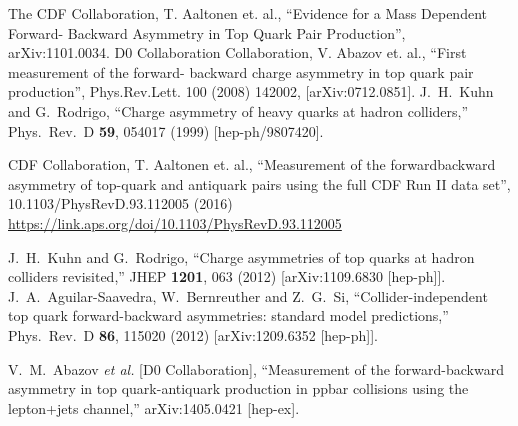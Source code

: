 \documentclass{cmspaperpdf}
\begin{document}
\clearpage


\begin{thebibliography}{9}

  The CDF Collaboration, T. Aaltonen et. al., ``Evidence for a Mass Dependent Forward- Backward Asymmetry in Top Quark Pair Production'', arXiv:1101.0034.
   D0 Collaboration Collaboration, V. Abazov et. al., ``First measurement of the forward- backward charge asymmetry in top quark pair production'', Phys.Rev.Lett. 100 (2008) 142002, [arXiv:0712.0851].
  J.~H.~Kuhn and G.~Rodrigo,
  ``Charge asymmetry of heavy quarks at hadron colliders,''
  Phys.\ Rev.\ D {\bf 59}, 054017 (1999)
  [hep-ph/9807420].
  
 CDF Collaboration, T. Aaltonen et. al., ``Measurement of the forwardbackward asymmetry of top-quark and antiquark pairs using the full CDF Run II data set'', 10.1103/PhysRevD.93.112005 (2016) \url{https://link.aps.org/doi/10.1103/PhysRevD.93.112005}
 
  
  J.~H.~Kuhn and G.~Rodrigo,
  ``Charge asymmetries of top quarks at hadron colliders revisited,''
  JHEP {\bf 1201}, 063 (2012)
  [arXiv:1109.6830 [hep-ph]].
  J.~A.~Aguilar-Saavedra, W.~Bernreuther and Z.~G.~Si,
  ``Collider-independent top quark forward-backward asymmetries: standard model predictions,''
  Phys.\ Rev.\ D {\bf 86}, 115020 (2012)
  [arXiv:1209.6352 [hep-ph]].
  
  V.~M.~Abazov {\it et al.}  [D0 Collaboration],
  ``Measurement of the forward-backward asymmetry in top quark-antiquark production in ppbar collisions using the lepton+jets channel,''
  arXiv:1405.0421 [hep-ex].


\end{thebibliography}
\end{document}
